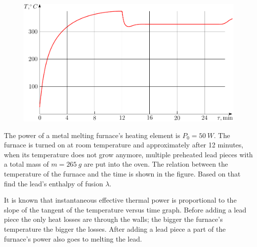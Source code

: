 {\ifEngStatement
\begin{figure}%
\includegraphics[width=\linewidth]{2012-v3g-07-ahi_graafik}%
\end{figure}
The power of a metal melting furnace’s heating element is $P_0 = \SI{50}{W}$. The furnace is turned on at room temperature and approximately after 12 minutes, when its temperature does not grow anymore, multiple preheated lead pieces with a total mass of $m = \SI{265}{g}$ are put into the oven. The relation between the temperature of the furnace and the time is shown in the figure. Based on that find the lead’s enthalpy of fusion $\lambda$.
\fi


\ifEngHint
It is known that instantaneous effective thermal power is proportional to the slope of the tangent of the temperature versus time graph. Before adding a lead piece the only heat losses are through the walls; the bigger the furnace’s temperature the bigger the losses. After adding a lead piece a part of the furnace’s power also goes to melting the lead.
\fi


}
